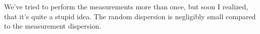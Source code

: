 We've tried to perform the measurements more than once, but soon I realized, that it's quite a stupid idea. The random dispersion is negligibly small compared to the measurement dispersion.